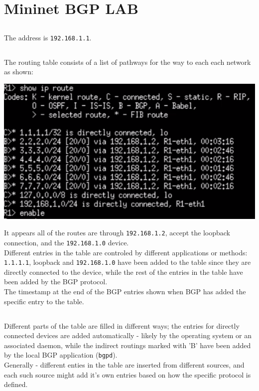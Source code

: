 \section{Mininet BGP LAB}
\subsection{}
The address is \texttt{192.168.1.1}.

\subsection{}
The routing table consists of a list of pathways for the way to each
each network as shown:
\begin{center}
    \includegraphics[width=1.2 \textwidth]{resources/q4-1.png}\centering
\end{center}
It appears all of the routes are through \texttt{192.168.1.2},
accept the loopback connection, and the \texttt{192.168.1.0} device.\\
Different entries in the table are controled by different applications or methods:
\texttt{1.1.1.1}, loopback and \texttt{192.168.1.0} have been
added to the table since they are directly connected to the device,
while the rest of the entries in the table have been added by the BGP protocol.\\
The timestamp at the end of the BGP entries shown when BGP has added the specific entry to the table.


\subsection{}
Different parts of the table are filled in different ways;
the entries for directly connected devices are added automatically - likely
by the operating system or an associated daemon,
while the indirect routings marked with 'B' have been added by the local
BGP application (\texttt{bgpd}).\\
Generally - different enties in the table are inserted from different sources,
and each such source might add it's own entries based on how the specific protocol is defined.



